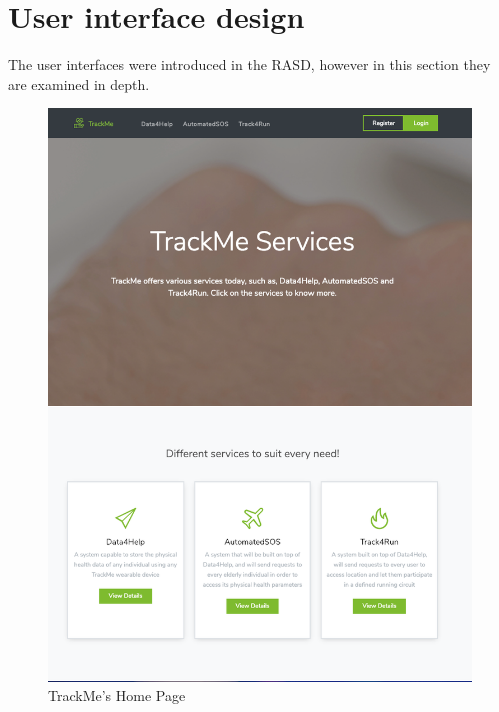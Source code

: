 \documentclass[a4paper, hidelinks, 12pt]{report}
\begin{document}
	\chapter{User interface design}
	The user interfaces were introduced in the RASD, however in this section they
are examined in depth. \\ 
	
	\begin{figure}[H]
		\centering
		\includegraphics[scale=0.8]{UI/home.png}
		\caption[UI: TrackMe's Home Page]{TrackMe's Home Page}
		\label{fig:Home_Page}
	\end{figure}
	
\end{document}
